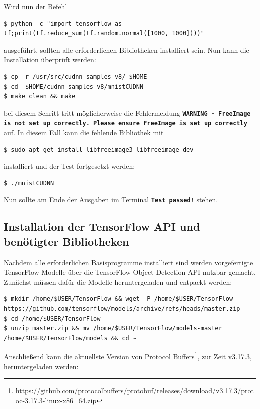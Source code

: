 \documentclass[12pt, oneside]{article}
\begin{document}
Wird nun der Befehl
\begin{verbatim}
$ python -c "import tensorflow as tf;print(tf.reduce_sum(tf.random.normal([1000, 1000])))"
\end{verbatim}
ausgeführt, sollten alle erforderlichen Bibliotheken installiert sein. Nun kann die Installation überprüft werden:

\begin{verbatim}
$ cp -r /usr/src/cudnn_samples_v8/ $HOME
$ cd  $HOME/cudnn_samples_v8/mnistCUDNN
$ make clean && make
\end{verbatim}    
bei diesem Schritt tritt möglicherweise die Fehlermeldung \textbf{\texttt{WARNING - FreeImage is not set up correctly. Please ensure FreeImage is set up correctly}} auf. In diesem Fall kann die fehlende Bibliothek mit

\begin{verbatim}
$ sudo apt-get install libfreeimage3 libfreeimage-dev
\end{verbatim} 
installiert und der Test fortgesetzt werden:

\begin{verbatim}
$ ./mnistCUDNN
\end{verbatim}
Nun sollte am Ende der Ausgaben im Terminal \textbf{\texttt{Test passed!}} stehen.

\subsection{Installation der TensorFlow API und benötigter Bibliotheken}

Nachdem alle erforderlichen Basisprogramme installiert sind werden vorgefertigte TensorFlow-Modelle über die TensorFlow Object Detection API nutzbar gemacht. Zunächst müssen dafür die Modelle heruntergeladen und entpackt werden:

\begin{verbatim}
$ mkdir /home/$USER/TensorFlow && wget -P /home/$USER/TensorFlow https://github.com/tensorflow/models/archive/refs/heads/master.zip
$ cd /home/$USER/TensorFlow
$ unzip master.zip && mv /home/$USER/TensorFlow/models-master /home/$USER/TensorFlow/models && cd ~
\end{verbatim}
Anschließend kann die aktuellste Version von Protocol Buffers\footnote{\href{https://github.com/protocolbuffers/protobuf/releases/download/v3.17.3/protoc-3.17.3-linux-x86_64.zip}{\url{https://github.com/protocolbuffers/protobuf/releases/download/v3.17.3/protoc-3.17.3-linux-x86_64.zip}}}, zur Zeit v3.17.3, heruntergeladen werden:
\end{document}
